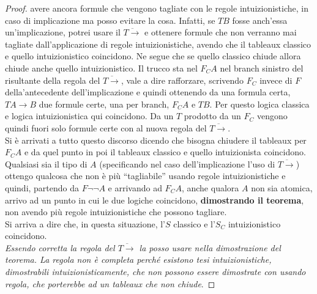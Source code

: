 \documentclass[a4paper,12pt, oneside]{book}
\begin{document}
\begin{proof}
  avere 
  ancora formule che vengono tagliate con le regole intuizionistiche, in caso di
  implicazione ma posso evitare la cosa. Infatti, se $TB$ fosse anch'essa
  un'implicazione, potrei usare il $\overline{T\to}$ e ottenere formule che non
  verranno mai tagliate dall'applicazione di regole intuizionistiche, avendo che
  il tableaux classico e quello intuizionistico coincidono. Ne segue che se
  quello classico chiude allora chiude anche quello intuizionistico. Il trucco
  sta nel $F_CA$ nel branch sinistro del risultante della regola del
  $\overline{T\to}$, vale a dire rafforzare, scrivendo $F_C$ invece di $F$
  della'antecedente dell'implicazione e quindi ottenendo da una formula certa,
  $TA\to B$ due formule certe, una per branch, $F_CA$ e $TB$. Per questo logica
  classica e logica intuizionistica qui coincidono. Da un $T$ prodotto da un
  $F_C$ vengono quindi fuori solo formule certe con al nuova regola del
  $\overline{T\to}$. \\
  Si è arrivati a tutto questo discorso dicendo che bisogna chiudere il tableaux
  per $F_CA$ e da quel punto in poi il tableaux classico e quello intuizionista
  coincidono. Qualsiasi sia il tipo di $A$ (specificando nel caso
  dell'implicazione l'uso di $\overline{T\to}$) ottengo qualcosa che non è più
  ``tagliabile'' usando regole intuizionistiche e quindi, partendo da $F\neg
  \neg A$ e arrivando ad $F_CA$, anche qualora $A$ non sia atomica, arrivo ad
  un punto in cui le due logiche coincidono, \textbf{dimostrando il teorema},
  non avendo più regole intuizionistiche che possono tagliare.\\
  Si arriva a dire che, in questa situazione, l'$S$ classico e l'$S_C$
  intuizionistico coincidono.\\
  \emph{Essendo corretta la regola del $\overline{T\to}$ la posso usare
    nella dimostrazione del teorema. La regola non è completa perché esistono
    tesi intuizionistiche, dimostrabili intuizionisticamente, che non possono
    essere dimostrate con usando regola, che porterebbe ad un tableaux che non
    chiude}. 
\end{proof}
\end{document}
